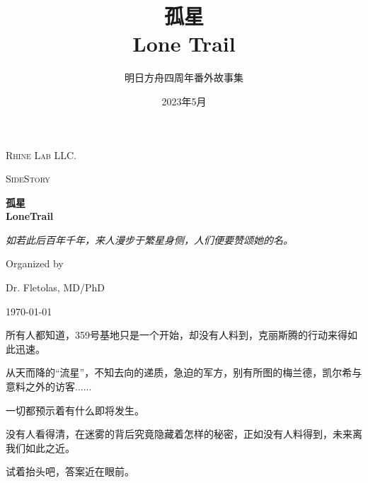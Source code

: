 \documentclass[openany]{book}
\title{孤星\\Lone Trail}
\author{明日方舟四周年番外故事集}
\date{2023年5月}
\begin{document}
\frontmatter
\maketitle
\thispagestyle{empty}
\begin{titlepage}
    \centering
    {\LARGE \textsc{Rhine Lab LLC.}\par}
    \vspace{1cm}
    {\Large \textsc{SideStory}\par}
    \vspace{1.5cm}
    {\huge\bfseries 孤星\\LoneTrail \par}
    \vspace{2cm}
    {\Large\itshape 如若此后百年千年，来人漫步于繁星身侧，人们便要赞颂她的名。\par}
    \vfill
    Organized by\par
    Dr. Fletolas, MD/PhD
    \vfill
    {\large \today\par}
\end{titlepage}
\thispagestyle{empty}
\clearpage
{}
\begin{center}
    \begin{minipage}{.6\textwidth}
        \begin{center}
            所有人都知道，359号基地只是一个开始，却没有人料到，克丽斯腾的行动来得如此迅速。 \par
            从天而降的“流星”，不知去向的递质，急迫的军方，别有所图的梅兰德，凯尔希与意料之外的访客...... \par
            一切都预示着有什么即将发生。 \par
            没有人看得清，在迷雾的背后究竟隐藏着怎样的秘密，正如没有人料得到，未来离我们如此之近。 \par
            试着抬头吧，答案近在眼前。
        \end{center}
    \end{minipage}
\end{center}
\thispagestyle{empty}
\tableofcontents
\thispagestyle{empty}

\clearpage
\thispagestyle{empty}
\addtocounter{page}{-1}
\null
\clearpage

\mainmatter
\end{document}
